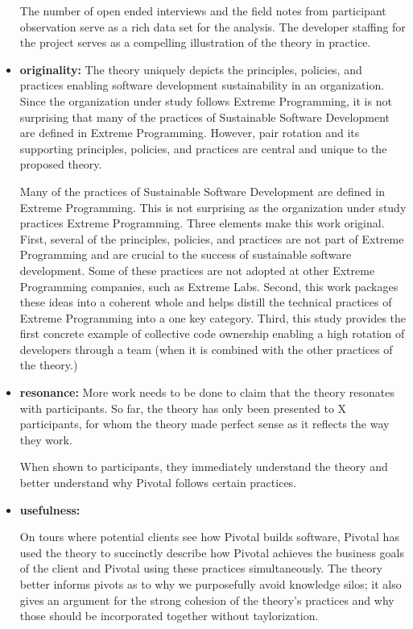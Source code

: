 \begin{table}[]
\begin{itemize}
The number of open ended interviews and the field notes from participant observation serve as a rich data set for the analysis. The developer staffing for the project serves as a compelling illustration of the theory in practice.

\item
\textbf{originality:} The theory uniquely depicts the principles, policies, and practices enabling software development sustainability in an organization. Since the organization under study follows Extreme Programming, it is not surprising that many of the practices of Sustainable Software Development are defined in Extreme Programming. However, pair rotation and its supporting principles, policies, and practices are central and unique to the proposed theory.

Many of the practices of Sustainable Software Development are defined in Extreme Programming. This is not surprising as the organization under study practices Extreme Programming. Three elements make this work original. First, several of the principles, policies, and practices are not part of Extreme Programming and are crucial to the success of sustainable software development. Some of these practices are not adopted at other Extreme Programming companies, such as Extreme Labs. Second, this work packages these ideas into a coherent whole and helps distill the technical practices of Extreme Programming into a one key category. Third, this study provides the first concrete example of collective code ownership enabling a high rotation of developers through a team (when it is combined with the other practices of the theory.)

\item
\textbf{resonance:} More work needs to be done to claim that the theory resonates with participants. So far, the theory has only been presented to X participants, for whom the theory made perfect sense as it reflects the way they work.

When shown to participants, they immediately understand the theory and better understand why Pivotal follows certain practices. 

\item
\textbf{usefulness:} 

On tours where potential clients see how Pivotal builds software, Pivotal has used the theory to succinctly describe how Pivotal achieves the business goals of the client and Pivotal using these practices simultaneously. The theory better informs pivots as to why we purposefully avoid knowledge silos; it also gives an argument for the strong cohesion of the theory's practices and why those should be incorporated together without taylorization. 
\end{itemize}


\end{table}
